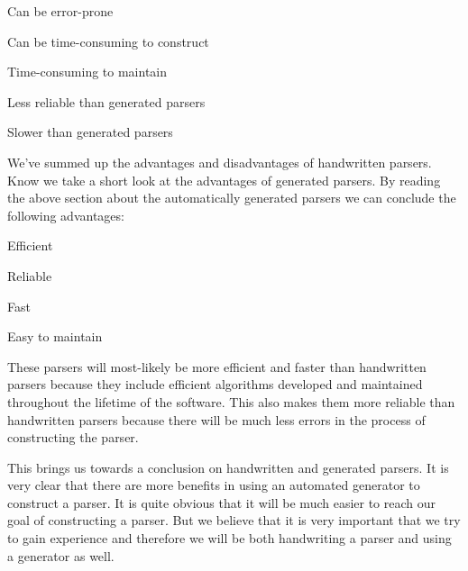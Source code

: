 \begin{dlist}
\item Can be error-prone
\item Can be time-consuming to construct
\item Time-consuming to maintain
\item Less reliable than generated parsers
\item Slower than generated parsers
\end{dlist}

We've summed up the advantages and disadvantages of handwritten parsers. Know we take a short look at the advantages of generated parsers. By reading the above section about the automatically generated parsers we can conclude the following advantages:

\begin{dlist}
\item Efficient
\item Reliable
\item Fast
\item Easy to maintain
\end{dlist}

These parsers will most-likely be more efficient and faster than handwritten parsers because they include efficient algorithms developed and maintained throughout the lifetime of the software. This also makes them more reliable than handwritten parsers because there will be much less errors in the process of constructing the parser.

This brings us towards a conclusion on handwritten and generated parsers. It is very clear that there are more benefits in using an automated generator to construct a parser. It is quite obvious that it will be much easier to reach our goal of constructing a parser. But we believe that it is very important that we try to gain experience and therefore we will be both handwriting a parser and using a generator as well.